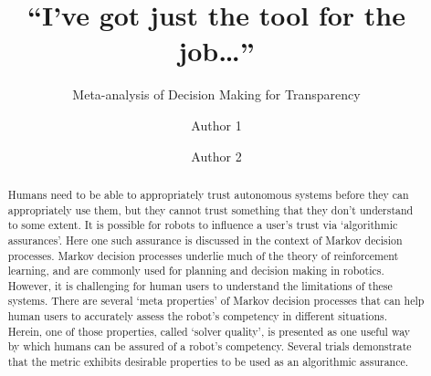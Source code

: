 \documentclass[sigconf,authordraft]{acmart}
\begin{document}
\title{``I've got just the tool for the job\ldots''}
\subtitle{Meta-analysis of Decision Making for Transparency}
\author{Author 1}
\author{Author 2}
\begin{abstract}
    Humans need to be able to appropriately trust autonomous systems before they can appropriately use them, but they cannot trust something that they don't understand to some extent. It is possible for robots to influence a user's trust via `algorithmic assurances'. Here one such assurance is discussed in the context of Markov decision processes. Markov decision processes underlie much of the theory of reinforcement learning, and are commonly used for planning and decision making in robotics. However, it is challenging for human users to understand the limitations of these systems. There are several `meta properties' of Markov decision processes that can help human users to accurately assess the robot's competency in different situations. Herein, one of those properties, called `solver quality', is presented as one useful way by which humans can be assured of a robot's competency. Several trials demonstrate that the metric exhibits desirable properties to be used as an algorithmic assurance.
\end{abstract}
\maketitle








\end{document}
